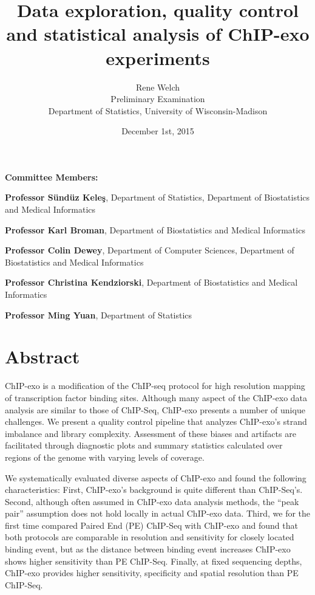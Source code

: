 \documentclass[11pt]{article}\usepackage[]{graphicx}\usepackage[]{color}
\title{Data exploration, quality control and statistical analysis of
  ChIP-exo experiments\vspace*{\fill}}
\author{Rene Welch\\Preliminary Examination\\Department of Statistics,
  University of Wisconsin-Madison}
\date{December 1st, 2015}
\begin{document}
\newcommand{\sig}{\sigma^{70}}

\maketitle

\vspace*{\fill}

\textbf{Committee Members:}

\textbf{Professor S\"und\"uz Kele\c{s}}, Department of Statistics,
Department of Biostatistics and Medical Informatics

\textbf{Professor Karl Broman}, Department of Biostatistics and
Medical Informatics

\textbf{Professor Colin Dewey}, Department of Computer Sciences,
Department of Biostatistics and Medical Informatics

\textbf{Professor Christina Kendziorski}, Department of Biostatistics
and Medical Informatics

\textbf{Professor Ming Yuan}, Department of Statistics

\thispagestyle{empty}


\newpage

\tableofcontents

\newpage

\listoffigures

\newpage


\section*{Abstract}

ChIP-exo is a modification of the ChIP-seq protocol for high
resolution mapping of transcription factor binding sites. Although
many aspect of the ChIP-exo data analysis are similar to those of
ChIP-Seq, ChIP-exo presents a number of unique challenges. We present
a quality control pipeline that analyzes ChIP-exo's strand imbalance
and library complexity. Assessment of these biases and artifacts are
facilitated through diagnostic plots and summary statistics calculated
over regions of the genome with varying levels of coverage.

We systematically evaluated diverse aspects of ChIP-exo and found the
following characteristics: First, ChIP-exo's background is quite
different than ChIP-Seq's. Second, although often assumed in ChIP-exo
data analysis methods, the ``peak pair'' assumption does not hold
locally in actual ChIP-exo data. Third, we for the first time compared
Paired End (PE) ChIP-Seq with ChIP-exo and found that both protocols
are comparable in resolution and sensitivity for closely located
binding event, but as the distance between binding event increases
ChIP-exo shows higher sensitivity than PE ChIP-Seq. Finally, at fixed
sequencing depths, ChIP-exo provides higher sensitivity, specificity
and spatial resolution than PE ChIP-Seq.
\end{document}
